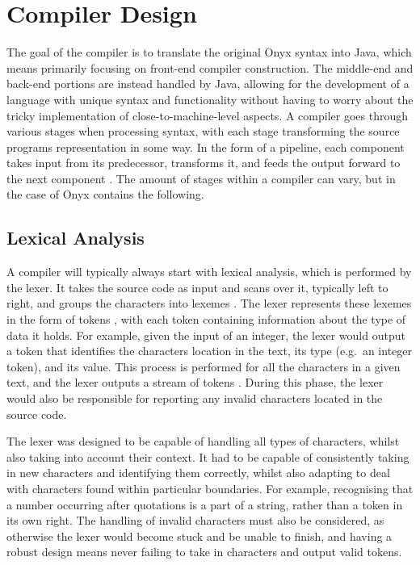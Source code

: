 \documentclass[
]{report}
\begin{document}
\section{Compiler Design}
The goal of the compiler is to translate the original Onyx syntax into
Java, which means primarily focusing on front-end compiler construction.
The middle-end and back-end portions are instead handled by Java,
allowing for the development of a language with unique syntax and
functionality without having to worry about the tricky implementation of
close-to-machine-level aspects. A compiler goes through various stages
when processing syntax, with each stage transforming the source programs
representation in some way. In the form of a pipeline, each component
takes input from its predecessor, transforms it, and feeds the output
forward to the next component \cite{guru99-website}. The amount of stages within a
compiler can vary, but in the case of Onyx contains the following.

\subsection{Lexical Analysis}
A compiler will typically always start with lexical analysis, which is
performed by the lexer. It takes the source code as input and scans over
it, typically left to right, and groups the characters into \glspl{lexeme}
\cite{guru99-website}. The lexer represents these \glspl{lexeme} in the form of \glspl{token}
\cite{tutorials-guide}, with each \gls{token} containing information about the type of data
it holds. For example, given the input of an integer, the lexer would
output a \gls{token} that identifies the characters location in the text, its
type (e.g.~an integer \gls{token}), and its value. This process is performed
for all the characters in a given text, and the lexer outputs a stream
of \glspl{token} \cite{kttpro-website}. During this phase, the lexer would also be
responsible for reporting any invalid characters located in the source
code.

The lexer was designed to be capable of handling all types of
characters, whilst also taking into account their context. It had to be
capable of consistently taking in new characters and identifying them
correctly, whilst also adapting to deal with characters found within
particular boundaries. For example, recognising that a number occurring
after quotations is a part of a string, rather than a \gls{token} in its own
right. The handling of invalid characters must also be considered, as
otherwise the lexer would become stuck and be unable to finish, and
having a robust design means never failing to take in characters and
output valid \glspl{token}.
\end{document}
